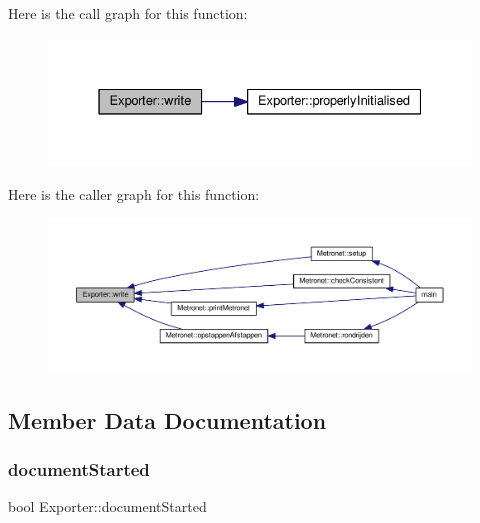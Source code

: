 Here is the call graph for this function\+:\nopagebreak
\begin{figure}[H]
\begin{center}
\leavevmode
\includegraphics[width=331pt]{class_exporter_ab3736803133eb727cf87a7306f91eb11_cgraph}
\end{center}
\end{figure}
Here is the caller graph for this function\+:\nopagebreak
\begin{figure}[H]
\begin{center}
\leavevmode
\includegraphics[width=350pt]{class_exporter_ab3736803133eb727cf87a7306f91eb11_icgraph}
\end{center}
\end{figure}


\subsection{Member Data Documentation}
\mbox{\label{class_exporter_a7d55f6023d5fe983512f6b02fb60733b}} 
\subsubsection{\texorpdfstring{document\+Started}{documentStarted}}
{\footnotesize\ttfamily bool Exporter\+::document\+Started\hspace{0.3cm}{\ttfamily [protected]}}

\mbox{\label{class_exporter_a74245e988d8e72a43704dda927acff05}} 
